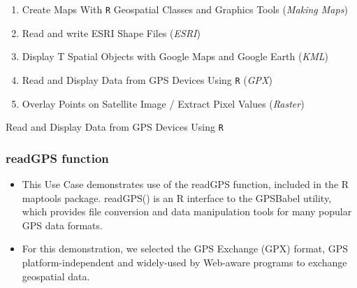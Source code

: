 \documentclass{beamer}
\begin{document}
\begin{frame}
\Large
\begin{enumerate}
\item Create Maps With \texttt{R} Geospatial Classes and Graphics Tools (\textit{Making Maps})
\item Read and write ESRI Shape Files (\textit{ESRI})
\item Display T Spatial Objects with Google Maps and Google Earth (\textit{KML})
\item Read and Display Data from GPS Devices Using \texttt{R} (\textit{GPX})
\item Overlay Points on Satellite Image / Extract Pixel Values (\textit{Raster})
\end{enumerate}
\end{frame}

\begin{frame}
\huge
Read and Display Data from GPS Devices Using \texttt{R}
\end{frame}
\begin{frame}
\frametitle{readGPS function}

\begin{itemize}
\item This Use Case demonstrates use of the readGPS function, included in the R maptools package. readGPS() is an R interface to the GPSBabel utility, which provides file conversion and data manipulation tools for many popular GPS data formats.

\item For this demonstration, we selected the GPS Exchange (GPX) format, GPS platform-independent and widely-used by Web-aware programs to exchange geospatial data.
\end{itemize}
\end{frame}
\end{document}
